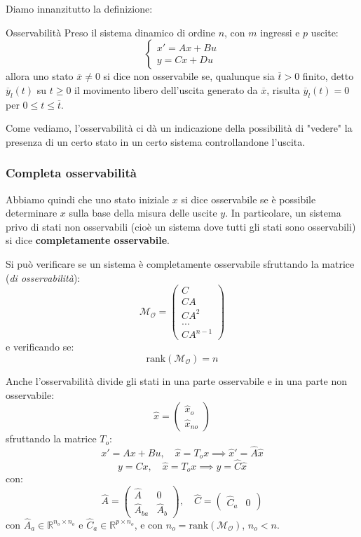 \documentclass[a4paper,11pt]{article}
\begin{document}
Diamo innanzitutto la definizione:
\begin{definition}{Osservabilità}
	Preso il sistema dinamico di ordine $n$, con $m$ ingressi e $p$ uscite:
	\[
		\begin{cases}
			x' = Ax + Bu \\ 
			y = Cx + Du
		\end{cases}
	\]
	allora uno stato $\overline{x} \neq 0$ si dice non osservabile se, qualunque sia $\overline{t} > 0$ finito, detto $\overline{y}_l(t)$ su $t \geq 0$ il movimento libero dell'uscita generato da $\overline{x}$, risulta $\overline{y}_l(t) = 0$ per $0 \leq t \leq \overline{t}$.
\end{definition}

Come vediamo, l'osservabilità ci dà un indicazione della possibilità di "vedere" la presenza di un certo stato in un certo sistema controllandone l'uscita.


\subsubsection{Completa osservabilità}
Abbiamo quindi che uno stato iniziale $x$ si dice osservabile se è possibile determinare $x$ sulla base della misura delle uscite $y$.
In particolare, un sistema privo di stati non osservabili (cioè un sistema dove tutti gli stati sono osservabili) si dice \textbf{completamente osservabile}.

Si può verificare se un sistema è completamente osservabile sfruttando la matrice (\textit{di osservabilità}):
$$
\mathcal{M}_\mathcal{O} = \begin{pmatrix}
C \\ 
C A \\
C A^2 \\
... \\
C A^{n - 1}
\end{pmatrix}
$$
e verificando se:
$$
\mathrm{rank}(\mathcal{M}_\mathcal{O}) = n
$$

Anche l'osservabilità divide gli stati in una parte osservabile e in una parte non osservabile:
$$
\hat{x} = \begin{pmatrix}
	\hat{x}_o \\ 
	\hat{x}_{no}
\end{pmatrix}
$$
sfruttando la matrice $T_o$:
$$
x' = Ax + Bu, \quad \hat{x} = T_o x \implies \hat{x}' = \hat{A} \hat{x} 
$$
$$
y = Cx, \quad \hat{x} = T_o x \implies y = \hat{C} \hat{x}
$$
con:
$$
\hat{A} = \begin{pmatrix}
	\hat{A} & 0 \\ 
	\hat{A}_{ba} & \hat{A}_b
\end{pmatrix}, \quad 
\hat{C} = \begin{pmatrix}
	\hat{C}_a & 0
\end{pmatrix}
$$
con $\hat{A}_a \in \mathbb{R}^{n_o \times n_o}$ e $\hat{C}_a \in \mathbb{R}^{p \times n_o}$, e con $n_o = \mathrm{rank}(\mathcal{M}_\mathcal{O})$, $n_o < n$.
\end{document}

